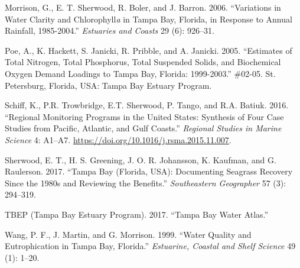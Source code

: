 \documentclass[]{article}
\begin{document}
\hypertarget{ref-Morrison06}{}
Morrison, G., E. T. Sherwood, R. Boler, and J. Barron. 2006.
``Variations in Water Clarity and Chlorophyll\emph{a} in Tampa Bay,
Florida, in Response to Annual Rainfall, 1985-2004.'' \emph{Estuaries
and Coasts} 29 (6): 926--31.

\hypertarget{ref-Poe05}{}
Poe, A., K. Hackett, S. Janicki, R. Pribble, and A. Janicki. 2005.
``Estimates of Total Nitrogen, Total Phosphorus, Total Suspended Solids,
and Biochemical Oxygen Demand Loadings to Tampa Bay, Florida:
1999-2003.'' \#02-05. St. Petersburg, Florida, USA: Tampa Bay Estuary
Program.

\hypertarget{ref-Schiff16}{}
Schiff, K., P.R. Trowbridge, E.T. Sherwood, P. Tango, and R.A. Batiuk.
2016. ``Regional Monitoring Programs in the United States: Synthesis of
Four Case Studies from Pacific, Atlantic, and Gulf Coasts.''
\emph{Regional Studies in Marine Science} 4: A1--A7.
\url{https://doi.org/10.1016/j.rsma.2015.11.007}.

\hypertarget{ref-Sherwood17}{}
Sherwood, E. T., H. S. Greening, J. O. R. Johansson, K. Kaufman, and G.
Raulerson. 2017. ``Tampa Bay (Florida, USA): Documenting Seagrass
Recovery Since the 1980s and Reviewing the Benefits.''
\emph{Southeastern Geographer} 57 (3): 294--319.

\hypertarget{ref-TBEP17}{}
TBEP (Tampa Bay Estuary Program). 2017. ``Tampa Bay Water Atlas.''

\hypertarget{ref-Wang99}{}
Wang, P. F., J. Martin, and G. Morrison. 1999. ``Water Quality and
Eutrophication in Tampa Bay, Florida.'' \emph{Estuarine, Coastal and
Shelf Science} 49 (1): 1--20.
\end{document}
